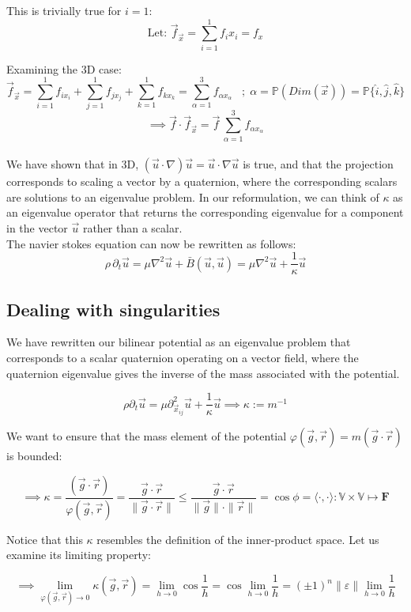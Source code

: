 \documentclass[12pt]{article}
\begin{document}
This is trivially true for \(i = 1\):
\[
\text{Let: } \vec f_{\vec x} = \sum_{i=1}^1 f_ix_i = f_x
\]

Examining the 3D case:
\[
\vec f_{\vec x} = \sum_{i=1}^{1} f_{ix_{i}} + \sum_{j=1}^{1} f_{jx_{j}} + \sum_{k=1}^{1} f_{kx_{k}} = \sum_{\alpha = 1}^{3} f_{\alpha x_{\alpha}}\;\;\;;\; \alpha = \mathbb{P}(Dim(\vec x)) = \mathbb{P}\{\hat i,\hat j,\hat k\}
\]
\[\implies
\vec f \cdot \vec f_{\vec x} = \vec f \, \sum_{\alpha=1}^{3} f_{\alpha x_{\alpha}}
\] \\ 
We have shown that in 3D, $(\vec u \cdot \nabla) \vec u = \vec u \cdot \nabla \vec u$ is true, and that the projection corresponds to scaling a vector by a quaternion, where the corresponding scalars are solutions to an eigenvalue problem. In our reformulation, we can think of $\kappa$ as an eigenvalue operator that returns the corresponding eigenvalue for a component in the vector $\vec u$ rather than a scalar.\\

The navier stokes equation can now be rewritten as follows: 
\[ 
\rho \,\partial_{t}\vec{u} = \mu\nabla^{2}\vec{u} + \bar{B}(\vec{u},\vec{u} ) = \mu \nabla^{2} \vec u + \frac{1}{\kappa}\vec u 
\]  

\subsection{Dealing with singularities}
We have rewritten our bilinear potential as an eigenvalue problem that corresponds to a scalar quaternion operating on a vector field, where the quaternion eigenvalue gives the inverse of the mass associated with the potential. 

\[\rho \partial_{t} \vec u = \mu \partial_{\vec x_{ij}}^{2} \vec u + \frac{1}{\kappa} \vec u 
\implies \kappa := m^{-1}\]

We want to ensure that the mass element of the potential $\varphi(\vec g, \vec r) = m(\vec g \cdot \vec r)$ is bounded: 

\[ \implies \kappa = \frac{(\vec g \cdot \vec r)}{\varphi(\vec g, \vec r)} = \frac{\vec g \cdot \vec r}{ \|\vec g \cdot \vec r\|} \le \frac{\vec g \cdot \vec r}{\|\vec g\| \cdot \|\vec r\|} = \cos{\phi} = \langle \cdot, \cdot\rangle : \mathbb{V} \times \mathbb{V} \mapsto \mathbf{F}\]

Notice that this $\kappa$ resembles the definition of the inner-product space. Let us examine its limiting property:

\[ \implies \lim_{\varphi(\vec g, \vec r) \to 0} \kappa (\vec g, \vec r) = \lim_{h \to 0} \cos{\frac{1}{h}} = \cos{ \lim_{h \to 0} \frac{1}{h}} = (\pm 1)^{n} \|\varepsilon\| \lim_{h\to0} \frac{1}{h}\]
\end{document}
